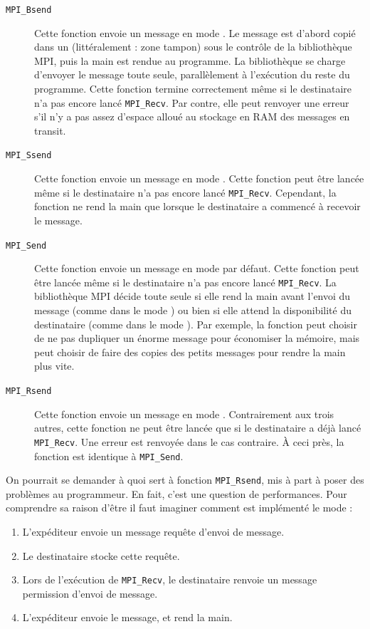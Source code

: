 \begin{description}
\item[\texttt{MPI\_Bsend}] Cette fonction envoie un message en mode \og
  \fg. Le message est d'abord copié dans un \og
  \fg (littéralement : zone tampon) sous le contrôle
  de la bibliothèque MPI, puis la main est rendue au programme. La
  bibliothèque se charge d'envoyer le message toute seule, parallèlement
  à l'exécution du reste du programme. Cette fonction termine
  correctement même si le destinataire n'a pas encore lancé
  \texttt{MPI\_Recv}.  Par contre, elle peut renvoyer une erreur s'il
  n'y a pas assez d'espace alloué au stockage en RAM des messages \og
  en transit\fg.

\item[\texttt{MPI\_Ssend}] Cette fonction envoie un message en mode \og
  \fg. Cette fonction peut être lancée même si le
  destinataire n'a pas encore lancé \texttt{MPI\_Recv}. Cependant, la
  fonction ne rend la main que lorsque le destinataire a commencé à
  recevoir le message.

\item[\texttt{MPI\_Send}] Cette fonction envoie un message en mode \og
  par défaut\fg. Cette fonction peut être lancée même si le
  destinataire n'a pas encore lancé \texttt{MPI\_Recv}. La bibliothèque
  MPI décide toute seule si elle rend la main avant l'envoi du message
  (comme dans le mode ) ou bien si elle attend la
  disponibilité du destinataire (comme dans le mode
  ). Par exemple, la fonction peut choisir de ne
  pas dupliquer un énorme message pour économiser la mémoire, mais
  peut choisir de faire des copies des petits messages pour rendre la
  main plus vite.

\item[\texttt{MPI\_Rsend}] Cette fonction envoie un message en mode \og
   \fg. Contrairement aux trois autres, cette fonction
  ne peut être lancée que si le destinataire a déjà lancé
  \texttt{MPI\_Recv}. Une erreur est renvoyée dans le cas
  contraire. \`A ceci près, la fonction est identique à \texttt{MPI\_Send}.
\end{description}

On pourrait se demander à quoi sert à fonction \texttt{MPI\_Rsend}, mis
à part à poser des problèmes au programmeur. En fait, c'est une
question de performances. Pour comprendre sa raison d'être il faut
imaginer comment est implémenté le mode  :
\begin{enumerate}
\item L'expéditeur envoie un message \og requête d'envoi de message\fg.
\item Le destinataire stocke cette requête.
\item Lors de l'exécution de \texttt{MPI\_Recv}, le destinataire
  renvoie un message \og permission d'envoi de message\fg.
\item L'expéditeur envoie le message, et rend la main.
\end{enumerate}

